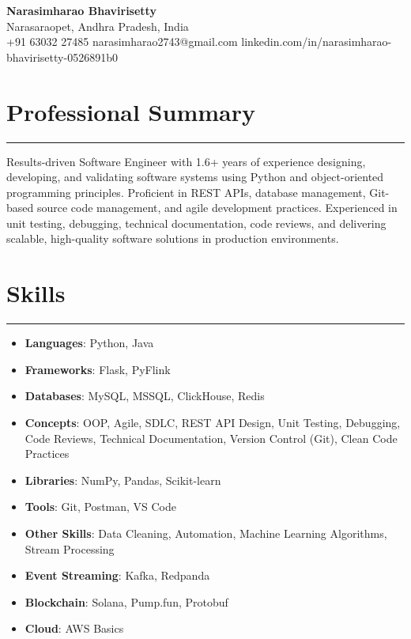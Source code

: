 \documentclass[12pt]{article}
\begin{document}
\begin{center}
  {\huge\textbf{Narasimharao Bhavirisetty}}\\[3pt]
  Narasaraopet, Andhra Pradesh, India \\[1pt]
  +91 63032 27485 \textbullet{} narasimharao2743@gmail.com \textbullet{}
  linkedin.com/in/narasimharao-bhavirisetty-0526891b0
\end{center}

\vspace{6pt}

\section*{Professional Summary}
\vspace{1pt}\hrule\vspace{4pt}
Results-driven Software Engineer with 1.6+ years of experience designing, developing, and validating software systems using Python and object-oriented programming principles. Proficient in REST APIs, database management, Git-based source code management, and agile development practices. Experienced in unit testing, debugging, technical documentation, code reviews, and delivering scalable, high-quality software solutions in production environments.

\section*{Skills}
\vspace{1pt}\hrule\vspace{4pt}
\begin{itemize}
  \item \textbf{Languages}: Python, Java
  \item \textbf{Frameworks}: Flask, PyFlink
  \item \textbf{Databases}: MySQL, MSSQL, ClickHouse, Redis
  \item \textbf{Concepts}: OOP, Agile, SDLC, REST API Design, Unit Testing, Debugging, Code Reviews, Technical Documentation, Version Control (Git), Clean Code Practices
  \item \textbf{Libraries}: NumPy, Pandas, Scikit-learn
  \item \textbf{Tools}: Git, Postman, VS Code
  \item \textbf{Other Skills}: Data Cleaning, Automation, Machine Learning Algorithms, Stream Processing
  \item \textbf{Event Streaming}: Kafka, Redpanda
  \item \textbf{Blockchain}: Solana, Pump.fun, Protobuf
  \item \textbf{Cloud}: AWS Basics
\end{itemize}
\end{document}
